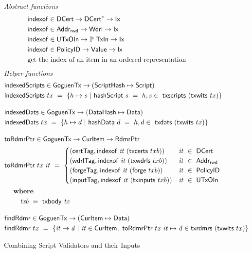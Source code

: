 \begin{figure}[htb]
  \emph{Abstract functions}
  \begin{align*}
    &\mathsf{indexof} \in \mathsf{DCert} \to \mathsf{DCert}^{*} \to \mathsf{Ix}\\
    &\mathsf{indexof} \in \mathsf{Addr_{rwd}} \to \mathsf{Wdrl} \to \mathsf{Ix}\\
    &\mathsf{indexof} \in \mathsf{UTxOIn} \to \mathbb{P}~\mathsf{TxIn} \to \mathsf{Ix}\\
    &\mathsf{indexof} \in \mathsf{PolicyID} \to \mathsf{Value} \to \mathsf{Ix}\\
    & \text{get the index of an item in an ordered representation}
  \end{align*}
  \emph{Helper functions}
  \begin{align*}
    &\fun{indexedScripts} \in \GoguenTx \to (\ScriptHash \mapsto \Script) \\
    &\fun{indexedScripts}~{tx} ~=~ \{ h \mapsto s ~\vert~ \fun{hashScript}~{s}~=~h,
     s\in~\fun{txscripts}~(\fun{txwits}~{tx})\}
    \nextdef
    &\fun{indexedDats} \in \GoguenTx \to (\DataHash \mapsto \Data)\\
    &\fun{indexedDats}~{tx} ~=~ \{ h \mapsto d ~\vert~ \fun{hashData}~{d}~=~h,
     d\in~\fun{txdats}~(\fun{txwits}~{tx})\}
    \nextdef
    &\fun{toRdmrPtr} \in \GoguenTx \to \CurItem \to \RdmrPtr \\
    &\fun{toRdmrPtr}~{tx}~{it} ~=~
      \begin{cases}
        (\mathsf{certTag},\fun{indexof}~\var{it}~(\fun{txcerts}~{txb}))   & \var{it}~\in~\DCert \\
        (\mathsf{wdrlTag},\fun{indexof}~\var{it}~(\fun{txwdrls}~{txb}))   & \var{it}~\in~\AddrRWD \\
        (\mathsf{forgeTag},\fun{indexof}~\var{it}~(\fun{forge}~{txb}))    & \var{it}~\in~\PolicyID \\
        (\mathsf{inputTag},\fun{indexof}~\var{it}~(\fun{txinputs}~{txb})) & \var{it}~\in~\UTxOIn
      \end{cases} \\
    & ~~\where \\
    & ~~~~~~~ \var{txb}~=~\txbody{tx}
    \nextdef
    &\fun{findRdmr} \in \GoguenTx \to (\CurItem \mapsto \Data)\\
    & \fun{findRdmr}~{tx} ~=~ \{ \var{it} \mapsto \var{d} ~|~
      \var{it} \in \CurItem,~ \fun{toRdmrPtr}~{tx}~{it} \mapsto \var{d} \in \fun{txrdmrs}~(\fun{txwits}~{tx}) \}
  \end{align*}
  \caption{Combining Script Validators and their Inputs}
  \label{fig:functions:script1}
\end{figure}


